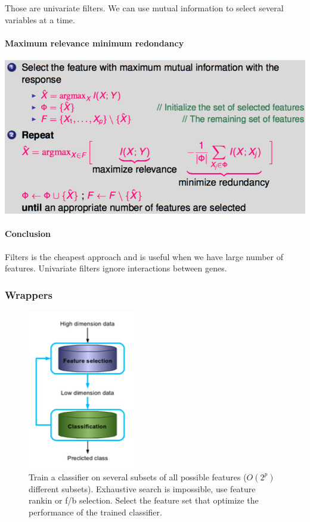 Those are univariate filters. We can use mutual information to select several variables at a time. 

\paragraph{Maximum relevance minimum redondancy}
\begin{center}
	\includegraphics[scale=0.6]{images/64_maxmin.png}
\end{center}

\paragraph{Conclusion}

Filters is the cheapest approach and is useful when we have large number of features. Univariate filters ignore interactions between genes. 

\subsubsection{Wrappers}

\begin{figure}[H]
	\centering
	\includegraphics[scale=0.6]{images/58_wrappers.png}
	\caption{Train a classifier on several subsets of all possible features ($O(2^p)$ different subsets). Exhaustive search is impossible, use feature rankin or f/b selection. Select the feature set that optimize the performance of the trained classifier.}
\end{figure}

